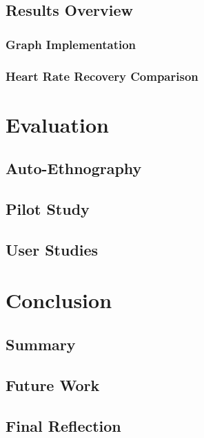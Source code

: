 \documentclass{l4proj}
\begin{document}
\section{Results Overview}

\subsection{Graph Implementation}

\subsection{Heart Rate Recovery Comparison}

\chapter{Evaluation} 

\section{Auto-Ethnography}

\section{Pilot Study}

\section{User Studies}


\chapter{Conclusion}    

\section{Summary}

\section{Future Work}

\section{Final Reflection}
\end{document}
